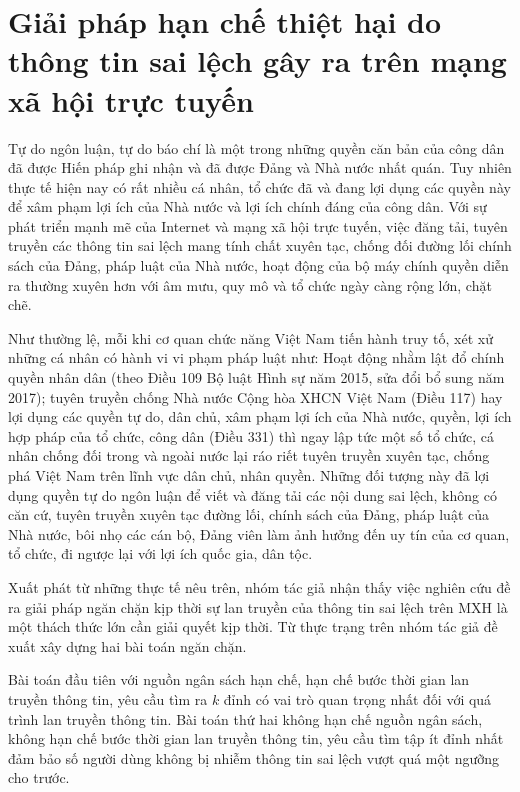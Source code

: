 \chapter{Giải pháp hạn chế thiệt hại do thông tin sai lệch gây ra trên mạng xã hội trực tuyến}

Tự do ngôn luận, tự do báo chí là một trong những quyền căn bản của công dân đã được Hiến pháp ghi nhận và đã được Đảng và Nhà nước nhất quán. Tuy nhiên thực tế hiện nay có rất nhiều cá nhân, tổ chức đã và đang lợi dụng các quyền này để xâm phạm lợi ích của Nhà nước và lợi ích chính đáng của công dân. Với sự phát triển mạnh mẽ của Internet và mạng xã hội trực tuyến, việc đăng tải, tuyên truyền các thông tin sai lệch mang tính chất xuyên tạc, chống đối đường lối chính sách của Đảng, pháp luật của Nhà nước, hoạt động của bộ máy chính quyền diễn ra thường xuyên hơn với âm mưu, quy mô và tổ chức ngày càng rộng lớn, chặt chẽ.

Như thường lệ, mỗi khi cơ quan chức năng Việt Nam tiến hành truy tố, xét xử những cá nhân có hành vi vi phạm pháp luật như: Hoạt động nhằm lật đổ chính quyền nhân dân (theo Điều 109 Bộ luật Hình sự năm 2015, sửa đổi bổ sung năm 2017); tuyên truyền chống Nhà nước Cộng hòa XHCN Việt Nam (Điều 117) hay lợi dụng các quyền tự do, dân chủ, xâm phạm lợi ích của Nhà nước, quyền, lợi ích hợp pháp của tổ chức, công dân (Điều 331) thì ngay lập tức một số tổ chức, cá nhân chống đối trong và ngoài nước lại ráo riết tuyên truyền xuyên tạc, chống phá Việt Nam trên lĩnh vực dân chủ, nhân quyền. Những đối tượng này đã lợi dụng quyền tự do ngôn luận để viết và đăng tải các nội dung sai lệch, không có căn cứ, tuyên truyền xuyên tạc đường lối, chính sách của Đảng, pháp luật của Nhà nước, bôi nhọ các cán bộ, Đảng viên làm ảnh hưởng đến uy tín của cơ quan, tổ chức, đi ngược lại với lợi ích quốc gia, dân tộc.

Xuất phát từ những thực tế nêu trên, nhóm tác giả nhận thấy việc nghiên cứu đề ra giải pháp ngăn chặn kịp thời sự lan truyền của thông tin sai lệch trên MXH là một thách thức lớn cần giải quyết kịp thời. Từ thực trạng trên nhóm tác giả đề xuất xây dựng hai bài toán ngăn chặn.

Bài toán đầu tiên với nguồn ngân sách hạn chế, hạn chế bước thời gian lan truyền thông tin, yêu cầu tìm ra $k$ đỉnh có vai trò quan trọng nhất đối với quá trình lan truyền thông tin. Bài toán thứ hai không hạn chế nguồn ngân sách, không hạn chế bước thời gian lan truyền thông tin, yêu cầu tìm tập ít đỉnh nhất đảm bảo số người dùng không bị nhiễm thông tin sai lệch vượt quá một ngưỡng cho trước.

